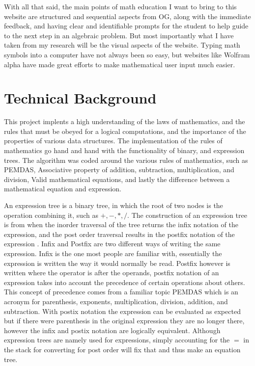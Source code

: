 \documentclass[10pt,twocolumn]{article}
\begin{document}
With all that said, the main points of math education I want to bring to this website are structured and sequential aspects from OG, along with the immediate feedback, and having clear and identifiable prompts for the student to help guide to the next step in an algebraic problem. But most importantly what I have taken from my research will be the visual aspects of the website. Typing math symbols into a computer have not always been so easy, but websites like Wolfram alpha have made great efforts to make mathematical user input much easier. 




\section{Technical Background}
This project implents a high understanding of the laws of mathematics, and the rules that must be obeyed for a logical computations, and the importance of the properties of various data structures. The implementation of the rules of mathematics go hand and hand with the functionality of binary, and expression trees. The algorithm was coded around the various rules of mathematics, such as PEMDAS, Associative property of addition, subtraction, multiplication, and division, Valid mathematical equations, and lastly the difference between a mathematical equation and expression. 


An expression tree is a binary tree, in which the root of two nodes is the operation combining it, such as $+, -, *, /$. The construction of an expression tree is from when the inorder traversal of the tree returns the infix notation of the expression, and the post order traversal results in the postfix notation of the expression \cite{noauthor_expression_2015}. Infix and Postfix are two different ways of writing the same expression. Infix is the one most people are familiar with, essentially the expression is written the way it would normally be read. Postfix however is written where the operator is after the operands, postfix notation of an expression takes into account the precedence of certain operations about others. This concept of precedence comes from a familiar topic PEMDAS which is an acronym for parenthesis, exponents, multiplication, division, addition, and subtraction. With postix notation the expression can be evaluated as expected but if there were parenthesis in the original expression they are no longer there, however the infix and postix notation are logically equivalent. Although expression trees are namely used for expressions, simply accounting for the $=$ in the stack for converting for post order will fix that and thus make an equation tree.  
\end{document}
